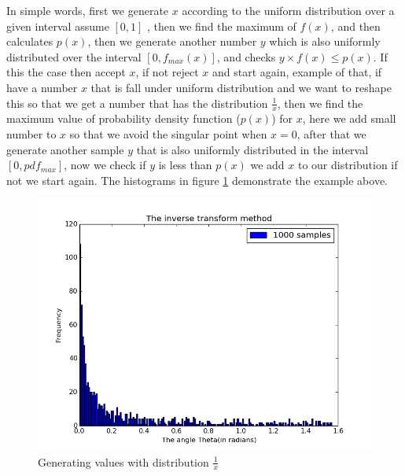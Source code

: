 In simple words, first we generate $x$ according to the uniform distribution over a given interval assume $[0,1]$ 
, then we find the maximum of $f(x)$, and then calculates $p(x)$, then we generate another number $y$ which is also uniformly distributed over the interval $[0,f_{max}(x)]$, and checks  $y \times f(x) \leq p(x)$.
If this the case then accept $x$, if not reject $x$ and start again, example of that, if have a number $x$ that is fall under uniform distribution and we want to reshape this so that we get a number  that has the distribution $\frac{1}{x}$, then we find the maximum value of probability density function ($p(x)$) for $x$, here we add small number to $x$ so that we avoid the singular point when $x = 0$, after that we generate another sample $y$ that is also uniformly distributed in the interval $[0,pdf_{max}]$, 
now we check if $y $ is less than $p(x)$ we add $x$ to our distribution if not we start again. The histograms in figure \ref{fig:2} demonstrate the example above.   

\begin{figure}[hbtp]
\centering
\includegraphics[scale=.5]{images/inverse_method.png}
\caption{Generating values with distribution $\frac{1}{x}$}\label{fig:2}
\end{figure}


